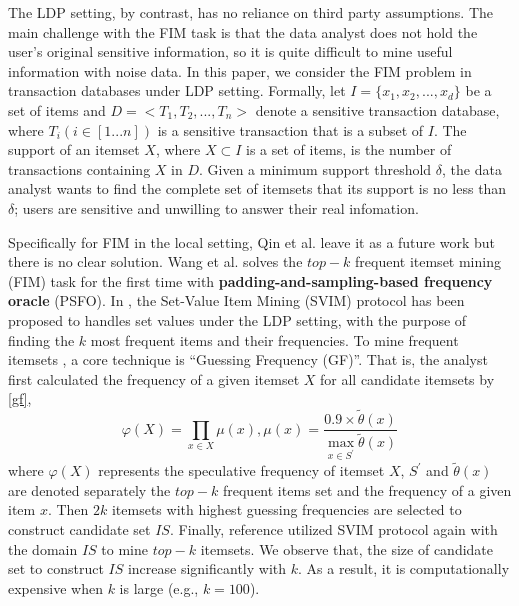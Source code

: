 \documentclass[conference]{IEEEtran}
\begin{document}
The LDP setting, by contrast, has no reliance on third party assumptions. The main challenge with the FIM task is that the data analyst does not hold the user's original sensitive information, so it is quite difficult to mine useful information with noise data. In this paper, we consider the FIM problem in transaction databases under LDP setting. Formally, let $I = \{x_1,x_2,...,x_d\}$ be a set of items and $D = <T_1,T_2,...,T_n>$ denote a sensitive transaction database, where $T_i(i \in [1...n])$ is a sensitive transaction that is a subset of $I$. The support of an itemset $X$, where $X \subset I$ is a set of items, is the number of transactions containing $X$ in $D$. Given a minimum support threshold $\delta$, the data analyst wants to find the complete set of itemsets that its support is no less than $\delta$; users are sensitive and unwilling to answer their real infomation.

Specifically for FIM in the local setting, Qin et al.\cite{a1} leave it as a future work but there is no clear solution. Wang et al.\cite{a2} solves  the $top-k$ frequent itemset mining (FIM) task for the first time with \textbf{padding-and-sampling-based frequency oracle} (PSFO). In \cite{a2}, the Set-Value Item Mining (SVIM) protocol has been proposed to handles set values under the LDP setting, with the purpose of finding the $k$ most frequent items and their frequencies. To mine frequent itemsets , a core technique is {\color{red}``Guessing Frequency (GF)''}. That is, the analyst first calculated  the frequency of a given itemset $X$ for all candidate itemsets by \eqref{gf},
\begin{equation}
\varphi(X)=\prod_{x \in X} \mu(x) , \mu(x) = \frac{0.9\times \tilde{\theta}(x)}{\max \limits_{x \in S^{\prime}} \tilde{\theta}(x)}\label{gf}
\end{equation}
where $\varphi(X)$ represents the speculative frequency of itemset $X$, $S^{\prime}$ and $\tilde{\theta}(x)$ are denoted separately the $top-k$ frequent items set and the frequency of a given item $x$. Then $2k$ itemsets with highest guessing frequencies are selected to construct candidate set $IS$. Finally, reference \cite{a2} utilized SVIM protocol again with the domain $IS$ to mine $top-k$ itemsets. We observe that, the size of candidate set to construct $IS$ increase significantly with $k$. As a result, it is computationally expensive when $k$ is large (e.g., $k=100$). 
\end{document}
